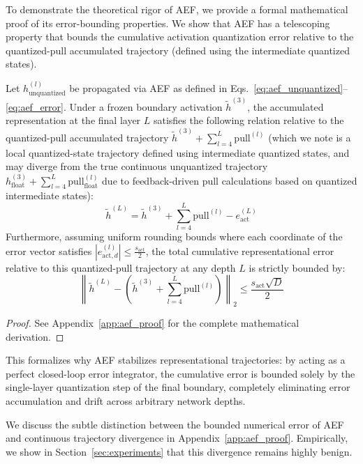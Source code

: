 To demonstrate the theoretical rigor of AEF, we provide a formal mathematical proof of its error-bounding properties. We show that AEF has a telescoping property that bounds the cumulative activation quantization error relative to the quantized-pull accumulated trajectory (defined using the intermediate quantized states).
\begin{theorem}\label{thm:aef_error_bound}
Let $h^{(l)}_{\text{unquantized}}$ be propagated via AEF as defined in Eqs.~\ref{eq:aef_unquantized}--\ref{eq:aef_error}. Under a frozen boundary activation $\tilde{h}^{(3)}$, the accumulated representation at the final layer $L$ satisfies the following relation relative to the quantized-pull accumulated trajectory $\tilde{h}^{(3)} + \sum_{l=4}^L \text{pull}^{(l)}$ (which we note is a local quantized-state trajectory defined using intermediate quantized states, and may diverge from the true continuous unquantized trajectory $h^{(3)}_{\text{float}} + \sum_{l=4}^L \text{pull}^{(l)}_{\text{float}}$ due to feedback-driven pull calculations based on quantized intermediate states):
\begin{equation}
    \tilde{h}^{(L)} = \tilde{h}^{(3)} + \sum_{l=4}^L \text{pull}^{(l)} - e^{(L)}_{\text{act}}
\end{equation}
Furthermore, assuming uniform rounding bounds where each coordinate of the error vector satisfies $|e_{\text{act}, d}^{(l)}| \leq \frac{s_{\text{act}}}{2}$, the total cumulative representational error relative to this quantized-pull trajectory at any depth $L$ is strictly bounded by:
\begin{equation}
    \left\| \tilde{h}^{(L)} - \left( \tilde{h}^{(3)} + \sum_{l=4}^L \text{pull}^{(l)} \right) \right\|_2 \leq \frac{s_{\text{act}} \sqrt{D}}{2}
\end{equation}
\end{theorem}
\begin{proof}
See Appendix~\ref{app:aef_proof} for the complete mathematical derivation.
\end{proof}
This formalizes why AEF stabilizes representational trajectories: by acting as a perfect closed-loop error integrator, the cumulative error is bounded solely by the single-layer quantization step of the final boundary, completely eliminating error accumulation and drift across arbitrary network depths. 

We discuss the subtle distinction between the bounded numerical error of AEF and continuous trajectory divergence in Appendix~\ref{app:aef_proof}. Empirically, we show in Section~\ref{sec:experiments} that this divergence remains highly benign.

